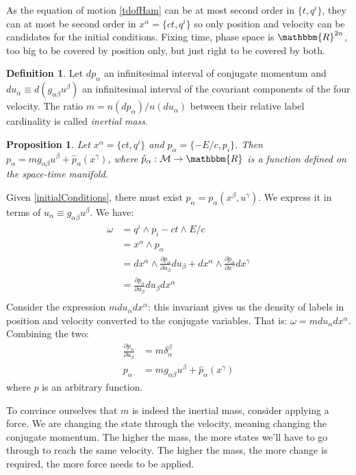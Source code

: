 \documentclass[aps,pra,10pt,twocolumn,floatfix,nofootinbib]{revtex4-1}
\newtheorem{prop}[thm]{Proposition}
\theoremstyle{definition}
\newtheorem{defn}[thm]{Definition}
\begin{document}
As the equation of motion \ref{tdofHam} can be at most second order in $\{t, q^i\}$, they can at most be second order in $x^\alpha=\{ct, q^i\}$ so only position and velocity can be candidates for the initial conditions. Fixing time, phase space is $\mathbbm{R}^{2n}$, too big to be covered by position only, but just right to be covered by both.

\begin{defn}\label{inertialMass}
Let $dp_\alpha$ an infinitesimal interval of conjugate momentum and $du_\alpha\equiv d(g_{\alpha \beta}u^\beta)$ an infinitesimal interval of the covariant components of the four velocity. The ratio $m=n(dp_\alpha)/n(du_\alpha)$ between their relative label cardinality is called \emph{inertial mass}.
\end{defn}

\begin{prop}\label{kineticMomentum}
Let $x^\alpha=\{ct, q^i\}$ and $p_\alpha=\{-E/c, p_i\}$. Then $p_\alpha= m g_{\alpha \beta}u^\beta + \hat{p}_\alpha(x^\gamma)$, where $\hat{p}_\alpha : \mathcal{M} \rightarrow \mathbbm{R}$ is a function defined on the space-time manifold.
\end{prop}

Given \ref{initialConditions}, there must exist $p_\alpha=p_\alpha(x^\beta , u^\gamma)$. We express it in terms of $u_\alpha\equiv g_{\alpha \beta} u^\beta$. We have:
\begin{align*}
\omega &= q^i\wedge p_i - ct \wedge E/c \\
&=x^\alpha \wedge p_\alpha \\
&=dx^\alpha \wedge \frac{\partial p_\alpha}{\partial u_\beta}du_\beta + dx^\alpha \wedge \frac{\partial p_\alpha}{\partial x^\gamma}dx^\gamma \\
&=\frac{\partial p_\alpha}{\partial u_\beta}du_\beta dx^\alpha \\
\end{align*}
Consider the expression $m du_\alpha dx^\alpha$: this invariant gives us the density of labels in position and velocity converted to the conjugate variables. That is: $\omega=m du_\alpha dx^\alpha$. Combining the two:
\begin{align*}
\frac{\partial p_\alpha}{\partial u_\beta} &= m \delta^\beta_\alpha \\
p_\alpha &= m g_{\alpha \beta}u^\beta + \hat{p}_\alpha(x^\gamma)
\end{align*}
where $\hat{p}$ is an arbitrary function.

To convince ourselves that $m$ is indeed the inertial mass, consider applying a force. We are changing the state through the velocity, meaning changing the conjugate momentum. The higher the mass, the more states we'll have to go through to reach the same velocity. The higher the mass, the more change is required, the more force needs to be applied.
\end{document}
